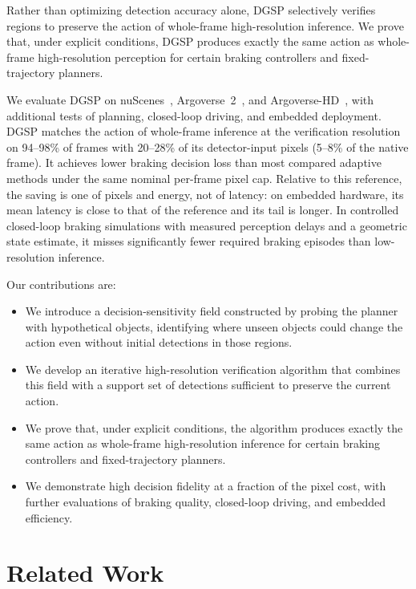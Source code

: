 \documentclass[10pt,twocolumn,letterpaper]{article}
\newcommand{\method}{DGSP\xspace}
\theoremstyle{definition}
\theoremstyle{remark}
\begin{document}
Rather than optimizing detection accuracy alone, \method selectively verifies regions to preserve the action of whole-frame high-resolution inference.
We prove that, under explicit conditions, \method produces exactly the same action as whole-frame high-resolution perception for certain braking controllers and fixed-trajectory planners.

We evaluate \method on nuScenes~\cite{nuscenes}, Argoverse~2~\cite{av2}, and Argoverse-HD~\cite{streaming}, with additional tests of planning, closed-loop driving, and embedded deployment.
\method matches the action of whole-frame inference at the verification resolution on 94--98\% of frames with 20--28\% of its detector-input pixels (5--8\% of the native frame).
It achieves lower braking decision loss than most compared adaptive methods under the same nominal per-frame pixel cap.
Relative to this reference, the saving is one of pixels and energy, not of latency: on embedded hardware, its mean latency is close to that of the reference and its tail is longer.
In controlled closed-loop braking simulations with measured perception delays and a geometric state estimate, it misses significantly fewer required braking episodes than low-resolution inference.

Our contributions are:
\begin{itemize}[leftmargin=*,itemsep=1pt,topsep=2pt]
  \item We introduce a decision-sensitivity field constructed by probing the planner with hypothetical objects, identifying where unseen objects could change the action even without initial detections in those regions.
  \item We develop an iterative high-resolution verification algorithm that combines this field with a support set of detections sufficient to preserve the current action.
  \item We prove that, under explicit conditions, the algorithm produces exactly the same action as whole-frame high-resolution inference for certain braking controllers and fixed-trajectory planners.
  \item We demonstrate high decision fidelity at a fraction of the pixel cost, with further evaluations of braking quality, closed-loop driving, and embedded efficiency.
\end{itemize}

\section{Related Work}
\label{sec:related}
\end{document}
